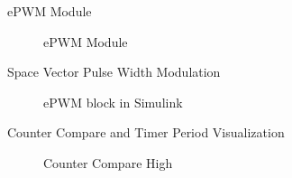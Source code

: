 \begin{frame}{ePWM Module}
	\begin{figure}
		\centering


		\caption{ePWM Module}
	\end{figure}
\end{frame}

\begin{frame}{Space Vector Pulse Width Modulation}
	\begin{figure}
		\centering


		\caption{ePWM block in Simulink}
	\end{figure}
\end{frame}



\begin{frame}{Counter Compare and Timer Period Visualization}
	\begin{figure}
		\centering
		\caption{Counter Compare High}
	\end{figure}
\end{frame}

